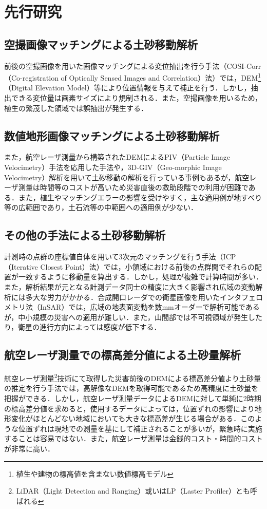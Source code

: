   \section{先行研究}
    \subsection*{空撮画像マッチングによる土砂移動解析}
      前後の空撮画像を用いた画像マッチングによる変位抽出を行う手法（COSI-Corr（Co-registration of Optically Sensed Images and Correlation）法）\cite{土砂移動解析1}では，DEM\footnote{植生や建物の標高値を含まない数値標高モデル}（Digital Elevation Model）等により位置情報を与えて補正を行う．しかし，抽出できる変位量は画素サイズにより規制される．また，空撮画像を用いるため，植生の繁茂した領域では誤抽出が発生する．


    \subsection*{数値地形画像マッチングによる土砂移動解析}
      また，航空レーザ測量から構築されたDEMによるPIV（Particle Image Velocimetry）手法\cite{土砂移動解析2}を応用した手法や，3D-GIV（Geo-morphic Image Velocimetry）解析\cite{土砂移動解析3, 土砂移動解析4, 土砂移動解析5}を用いて土砂移動の解析を行っている事例もあるが，航空レーザ測量は時間等のコストが高いため災害直後の救助段階での利用が困難である．また，植生やマッチングエラーの影響を受けやすく，主な適用例が地すべり等の広範囲であり，土石流等の中範囲への適用例が少ない．
      

    \subsection*{その他の手法による土砂移動解析}
      計測時の点群の座標値自体を用いて3次元のマッチングを行う手法（ICP（Iterative Closest Point）法）\cite{土砂移動解析5}では，小領域における前後の点群間でそれらの配置が一致するように移動量を算出する．しかし，処理が複雑で計算時間が多い．また，解析結果が元となる計測データ同士の精度に大きく影響され広域の変動解析には多大な労力がかかる．合成開口レーダでの衛星画像を用いたインタフェロメトリ法（InSAR）\cite{土砂移動解析6}では，広域の地表面変動を数mmオーダーで解析可能であるが，中小規模の災害への適用が難しい．また，山間部では不可視領域が発生したり，衛星の進行方向によっては感度が低下する．


    \subsection*{航空レーザ測量での標高差分値による土砂量解析}
      \label{航空レーザ測量での標高差分値による土砂量解析}
      航空レーザ測量\footnote{LiDAR（Light Detection and Ranging）或いはLP（Laster Profiler）とも呼ばれる}技術にて取得した災害前後のDEMによる標高差分値より土砂量の推定を行う手法\cite{土砂量解析1, 土砂量解析2}では，高解像なDEMを取得可能であるため高精度に土砂量を把握ができる．しかし，航空レーザ測量データによるDEMに対して単純に2時期の標高差分値を求めると，使用するデータによっては，位置ずれの影響により地形変化がほとんどない地域においても大きな標高差が生じる場合がある．このような位置ずれは現地での測量を基にして補正されることが多いが，緊急時に実施することは容易ではない．また，航空レーザ測量は金銭的コスト・時間的コストが非常に高い．


